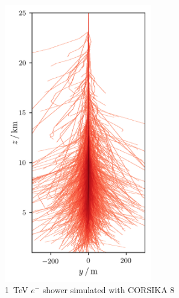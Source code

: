 \begin{frame}[c]
\begin{columns}[onlytextwidth]
\begin{column}{0.6\textwidth}
    \end{column}
        \begin{column}{0.4\textwidth}
            \begin{figure}
                \centering
                \includegraphics[width=0.6\textwidth]{plots/shower.png}
                \caption*{\SI{1}{\tera\electronvolt} $e^-$ shower simulated with CORSIKA 8}
            \end{figure}
        \end{column}
    \end{columns}
\end{frame}

